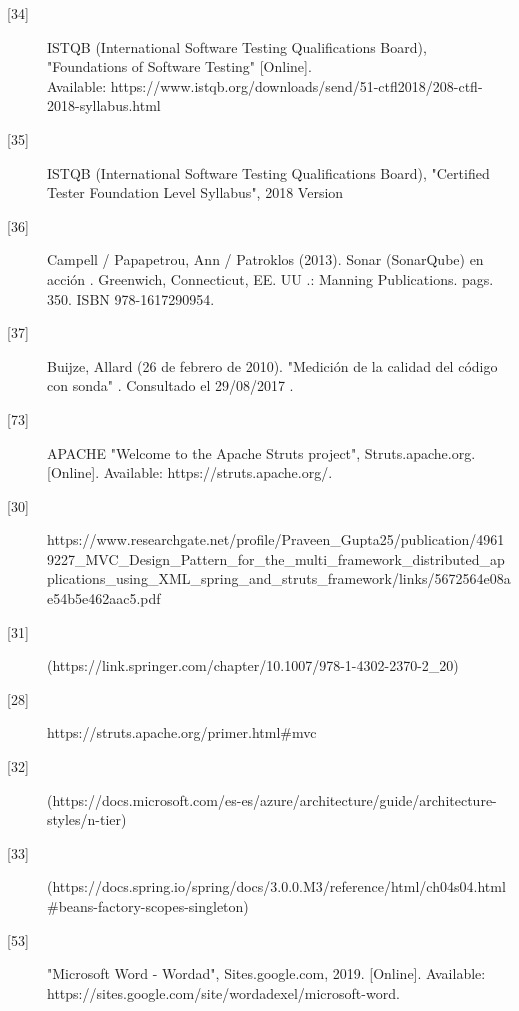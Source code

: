 \begin{description}
		\item[\hypertarget{b34}{[34]}] ISTQB (International Software Testing Qualifications Board), "Foundations of Software Testing" [Online].\\ Available: 
		https://www.istqb.org/downloads/send/51-ctfl2018/208-ctfl-2018-syllabus.html
		
		\item[\hypertarget{b35}{[35]}] ISTQB (International Software Testing Qualifications Board), "Certified Tester
		Foundation Level Syllabus", 2018 Version 
		
		\item[\hypertarget{b36}{[36]}] Campell / Papapetrou, Ann / Patroklos (2013). Sonar (SonarQube) en acción . Greenwich, Connecticut, EE. UU .: Manning Publications. pags. 350. ISBN 978-1617290954.
		
		\item[\hypertarget{b37}{[37]}] Buijze, Allard (26 de febrero de 2010). "Medición de la calidad del código con sonda" . Consultado el 29/08/2017 .
		
		\item[\hypertarget{b73}{[73]}] APACHE "Welcome to the Apache Struts project", Struts.apache.org. [Online]. Available: https://struts.apache.org/. 
				
		\item[\hypertarget{b30}{[30]}] 	https://www.researchgate.net/profile/Praveen\_Gupta25/publication/49619227\_MVC\_Design\_Pattern\_for\_the\_multi\_framework\_distributed\_applications\_using\_XML\_spring\_and\_struts\_framework/links/5672564e08ae54b5e462aac5.pdf
		
		\item[\hypertarget{b31}{[31]}] (https://link.springer.com/chapter/10.1007/978-1-4302-2370-2\_20)
		
		\item[\hypertarget{b28}{[28]}] https://struts.apache.org/primer.html\#mvc
		
		\item[\hypertarget{b32}{[32]}] (https://docs.microsoft.com/es-es/azure/architecture/guide/architecture-styles/n-tier)
		\item[\hypertarget{b33}{[33]}](https://docs.spring.io/spring/docs/3.0.0.M3/reference/html/ch04s04.html\#beans-factory-scopes-singleton)
		
		\item[\hypertarget{b53}{[53]}]"Microsoft Word - Wordad", Sites.google.com, 2019. [Online]. Available: https://sites.google.com/site/wordadexel/microsoft-word. 
		

\end{description}
